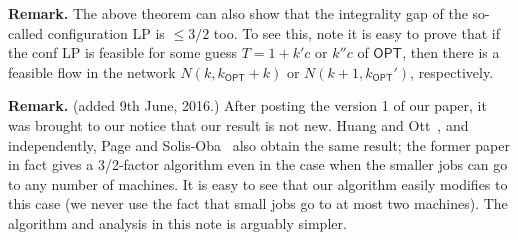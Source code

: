 \documentclass[11pt]{article}
\newcommand{\OPT}{\mathsf{OPT}}
\newcommand{\kk}{k_{\scriptscriptstyle \OPT}}
\newcommand{\kkk}{k'}
\newcommand{\kkkk}{k_{\scriptscriptstyle \OPT}'}
\begin{document}
\noindent
{\bf Remark.} The above theorem can also show that the integrality gap of the so-called configuration LP is $\leq 3/2$ too. To see this, note it is easy to prove that if the conf LP is feasible for some guess $T = 1+\kkk c$ or $k''c$ of $\OPT$, 
then there is a feasible flow in the network $N(k,\kk + k)$ or $N(k+1,\kkkk)$, respectively.\smallskip

\noindent
{\bf Remark.}  (added 9th June, 2016.) After posting the version 1 of our paper, it was brought to our notice that our result is not new. Huang and Ott~\cite{HO15}, and independently, Page and Solis-Oba~\cite{PS16} also obtain the same result; the former paper in fact gives a 3/2-factor algorithm even in the case when the smaller jobs can go to any number of machines. It is easy to see that our algorithm easily modifies to this case (we never use the fact that small jobs go to at most two machines). The algorithm and analysis in this note is arguably simpler.





\end{document}
